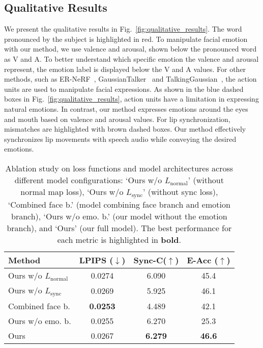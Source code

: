 \subsection{Qualitative Results}
We present the qualitative results in Fig.~\ref{fig:qualitative_results}. The word pronounced by the subject is highlighted in red. To manipulate facial emotion with our method, we use valence and arousal, shown below the pronounced word as V and A. To better understand which specific emotion the valence and arousal represent, the emotion label is displayed below the V and A values. For other methods, such as ER-NeRF~\cite{li2023efficient}, GaussianTalker~\cite{cho2024gaussiantalker} and TalkingGaussian~\cite{li2024talkinggaussian}, the action units are used to manipulate facial expressions. As shown in the blue dashed boxes in Fig.~\ref{fig:qualitative_results}, action units have a limitation in expressing natural emotions. In contrast, our method expresses emotions around the eyes and mouth based on valence and arousal values. For lip synchronization, mismatches are highlighted with brown dashed boxes. Our method effectively synchronizes lip movements with speech audio while conveying the desired emotions.

\begin{table}[t]
    \centering
    \begin{tabular}{l|cc|c}
    \hline
    Method & LPIPS ($\downarrow$) & Sync-C($\uparrow$) & E-Acc ($\uparrow$) \\
    \hline
    Ours w/o $L_\text{normal}$ & 0.0274 & 6.090 & 45.4 \\
    Ours w/o $L_\text{sync}$ & 0.0269 & 5.925 & 46.1 \\
    \hline
    Combined face b.  & \textbf{0.0253} & 4.489 & 42.1 \\
    Ours w/o emo. b. & 0.0255 & 6.270 & 25.3 \\
    \hline
    Ours & 0.0267 & \textbf{6.279} & \textbf{46.6} \\
    \hline
    \end{tabular}
    \vspace{-3mm}
    \caption{Ablation study on loss functions and model architectures across different model configurations: `Ours w/o $L_\text{normal}$' (without normal map loss), `Ours w/o $L_\text{sync}$' (without sync loss), `Combined face b.' (model combining face branch and emotion branch), `Ours w/o emo. b.' (our model without the emotion branch), and `Ours' (our full model). The best performance for each metric is highlighted in \textbf{bold}.}
    \label{tab:ablation study}
    \vspace{-3mm}
\end{table}

